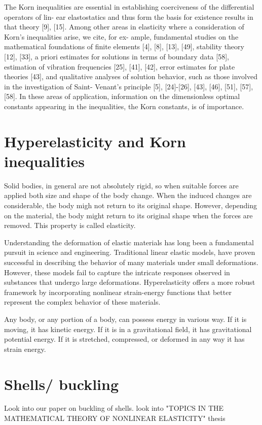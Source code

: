 \documentclass[proper,prettymath,members3]{ucsbthesis}
\begin{document}
The
 Korn inequalities are essential in establishing coerciveness of the differential operators of lin-
 ear elastostatics and thus form the basis for existence results in that theory [9], [15]. Among
 other areas in elasticity where a consideration of Korn's inequalities arise, we cite, for ex-
 ample, fundamental studies on the mathematical foundations of finite elements [4], [8], [13],
 [49], stability theory [12], [33], a priori estimates for solutions in terms of boundary data [58],
 estimation of vibration frequencies [25], [41], [42], error estimates for plate theories [43], and
 qualitative analyses of solution behavior, such as those involved in the investigation of Saint-
 Venant's principle [5], [24]-[26], [43], [46], [51], [57], [58]. In these areas of application,
 information on the dimensionless optimal constants appearing in the inequalities, the Korn
 constants, is of importance.
\section{Hyperelasticity and Korn inequalities}

Solid bodies, in general are not absolutely rigid, so when suitable forces are applied both size and shape of the body change. When  the induced changes are considerable, the body migh not return to its original shape. However, depending on the material, the body might return to its original shape when the forces are removed. This property is called elasticity. 

Understanding the deformation of elastic materials has long been a fundamental pursuit in science and engineering. Traditional linear elastic models, have proven successful in describing the behavior of many materials under small deformations. However, these models fail to capture the intricate responses observed in substances that undergo large deformations. Hyperelasticity offers a more robust framework by incorporating nonlinear strain-energy functions that better represent the complex behavior of these materials. 

Any body, or any portion of a body, can possess energy in various way. If it is moving, it has kinetic energy. If it is in a gravitational field, it has gravitational potential energy. If it is stretched, compressed, or deformed in any way it has strain energy. 

\section{Shells/ buckling}
Look into our paper on buckling of shells.
look into "TOPICS IN THE MATHEMATICAL THEORY OF NONLINEAR
ELASTICITY" thesis
\end{document}
